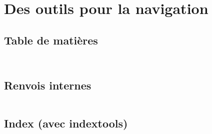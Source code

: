 \section{Des outils pour la navigation}

\subsection{Table de matières}

\begin{slide}
  \inputminted{latex}{examples/toc.tex}
\end{slide}

\begin{slide}
  \inputminted{latex}{examples/minitoc.tex}
\end{slide}

\subsection{Renvois internes}
\begin{slide}
  \inputminted{latex}{examples/renvois.tex}
\end{slide}

\subsection{Index (avec indextools)}
\begin{slide}
  \inputminted{latex}{examples/index-def.tex}
\end{slide}

\begin{slide}
  \inputminted{latex}{examples/index-appel.tex}
\end{slide}

\begin{slide}
  \inputminted{latex}{examples/index-impression.tex}
\end{slide}


